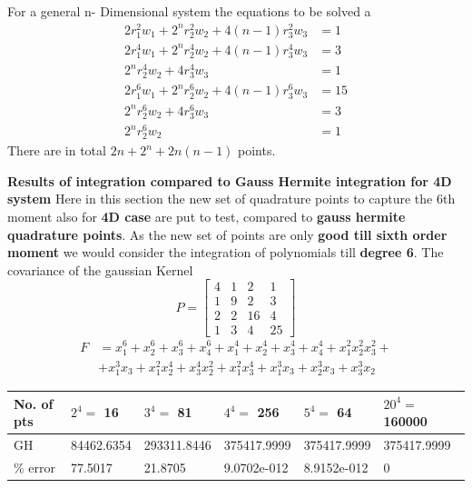 \documentclass[landscape]{slides}
\begin{document}
\begin{slide}
 For a general n- Dimensional system the equations to be solved a
 \begin{align*}
 2r_1^2w_1+2^nr_2^2w_2+4(n-1)r_3^2w_3&=1\\
 2r_1^4w_1+2^nr_2^4w_2+4(n-1)r_3^4w_3&=3\\
 2^nr_2^4w_2+4r_3^4w_3&=1\\
 2r_1^6w_1+2^nr_2^6w_2+4(n-1)r_3^6w_3&=15\\
 2^nr_2^6w_2+4r_3^6w_3&=3\\
 2^nr_2^6w_2&=1
 \end{align*}
 There are in total {\bf $2n+2^n+2n(n-1)$} points.
    	\end{slide}
\begin{slide}
 {\bf Results of integration compared to Gauss Hermite integration for 4D system}\newline\newline
Here in this section the new set of quadrature points to capture the 6th moment also for {\bf 4D case} are put to test, compared to {\bf gauss hermite quadrature points}. As the new set of points are only {\bf good till sixth order moment} we would consider the integration of polynomials till {\bf degree 6}.\newline
 The covariance of the gaussian Kernel
\[
 P = \begin{bmatrix}
       4 & 1 & 2  & 1   \\
       1 & 9 & 2  & 3   \\
       2 & 2 & 16 & 4  \\
       1 & 3 & 4 & 25  
     \end{bmatrix}
\]
\begin{align*}
F&=x_1^6+x_2^6+x_3^6+x_4^6+x_1^4+x_2^4+x_3^4+x_4^4+x_1^2x_2^2x_3^2+\\
&+x_1^3x_3+x_1^2x_2^4+x_3^4x_2^2+x_1^2x_3^4+x_1^3x_3+x_2^3x_3+x_3^3x_2
\end{align*}
\tiny
  \begin{tabular}{ | l | l | l | l | l | l | }
    \hline
       No. of pts 					& $2^4=$ 16 							& $3^4=$ 81 			  & $4^4=$ 256			 & $5^4=$ 64 	  	& $20^4=$ 160000 \\ \hline 
      GH          					&   84462.6354  		& 293311.8446    & 375417.9999     	 & 375417.9999  		  &   375417.9999           \\ \hline
\% error        	  &   77.5017    		&  21.8705  	  	& 9.0702e-012   & 8.9152e-012   &   0                      \\ 
      \hline 
  \end{tabular}


\end{slide}
\end{document}
